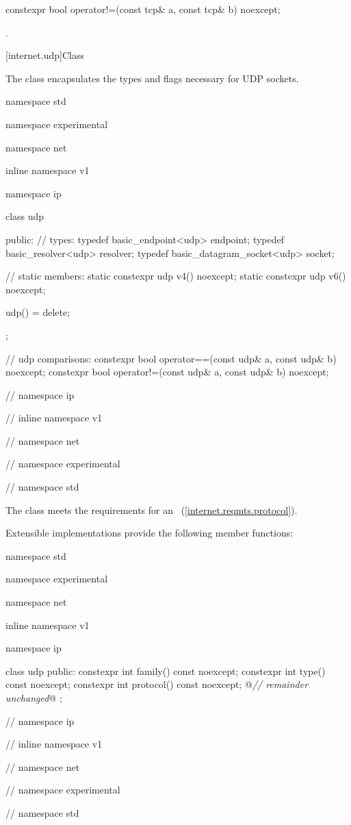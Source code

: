 \begin{itemdecl}
constexpr bool operator!=(const tcp& a, const tcp& b) noexcept;
\end{itemdecl}

\begin{itemdescr}
\pnum
\returns {}.
\end{itemdescr}




%
[internet.udp]{Class }

\pnum
The class  encapsulates the types and flags necessary for UDP sockets.

\begin{codeblock}
namespace std {
namespace experimental {
namespace net {
inline namespace v1 {
namespace ip {

  class udp
  {
  public:
    // types:
    typedef basic_endpoint<udp> endpoint;
    typedef basic_resolver<udp> resolver;
    typedef basic_datagram_socket<udp> socket;

    // static members:
    static constexpr udp v4() noexcept;
    static constexpr udp v6() noexcept;

    udp() = delete;
  };

  // udp comparisons:
  constexpr bool operator==(const udp& a, const udp& b) noexcept;
  constexpr bool operator!=(const udp& a, const udp& b) noexcept;

} // namespace ip
} // inline namespace v1
} // namespace net
} // namespace experimental
} // namespace std
\end{codeblock}

\pnum
The  class meets the requirements for an ~(\ref{internet.reqmts.protocol}).

%
\pnum
 Extensible implementations provide the following member functions:

\begin{codeblock}
namespace std {
namespace experimental {
namespace net {
inline namespace v1 {
namespace ip {

  class udp
  {
  public:
    constexpr int family() const noexcept;
    constexpr int type() const noexcept;
    constexpr int protocol() const noexcept;
    @\textit{// remainder unchanged}@
  };

} // namespace ip
} // inline namespace v1
} // namespace net
} // namespace experimental
} // namespace std
\end{codeblock}

